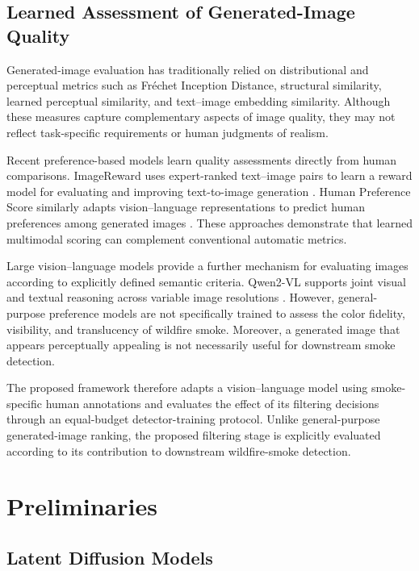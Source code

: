 \documentclass[journal]{IEEEtran}
\begin{document}
\subsection{Learned Assessment of Generated-Image Quality}
\label{subsec:related_quality_assessment}

Generated-image evaluation has traditionally relied on distributional
and perceptual metrics such as Fréchet Inception Distance, structural
similarity, learned perceptual similarity, and text--image embedding
similarity. Although these measures capture complementary aspects of
image quality, they may not reflect task-specific requirements or
human judgments of realism.

Recent preference-based models learn quality assessments directly from
human comparisons. ImageReward uses expert-ranked text--image pairs to
learn a reward model for evaluating and improving text-to-image
generation
\cite{xu2023imagerewardlearningevaluatinghuman}. Human Preference Score
similarly adapts vision--language representations to predict human
preferences among generated images
\cite{wu2023humanpreferencescorebetter}. These approaches demonstrate
that learned multimodal scoring can complement conventional automatic
metrics.

Large vision--language models provide a further mechanism for
evaluating images according to explicitly defined semantic criteria.
Qwen2-VL supports joint visual and textual reasoning across variable
image resolutions
\cite{wang2024qwen2vlenhancingvisionlanguagemodels}. However,
general-purpose preference models are not specifically trained to
assess the color fidelity, visibility, and translucency of wildfire
smoke. Moreover, a generated image that appears perceptually appealing
is not necessarily useful for downstream smoke detection.

The proposed framework therefore adapts a vision--language model using
smoke-specific human annotations and evaluates the effect of its
filtering decisions through an equal-budget detector-training protocol.
Unlike general-purpose generated-image ranking, the proposed filtering
stage is explicitly evaluated according to its contribution to
downstream wildfire-smoke detection.
\section{Preliminaries}
\label{sec:prelim}


\subsection{Latent Diffusion Models}
\label{subsec:prelim_ldm}
\end{document}
